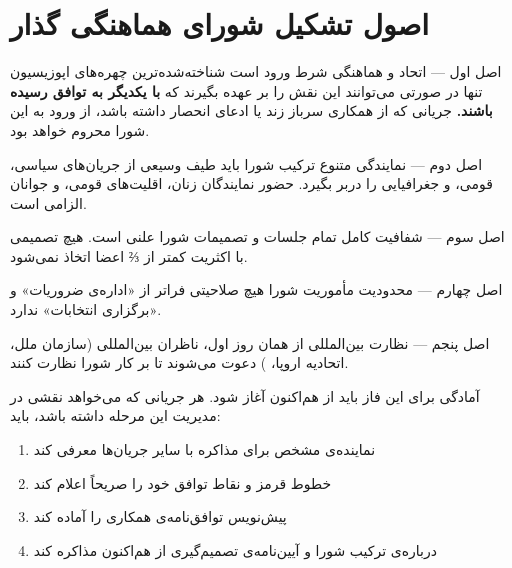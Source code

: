 \documentclass[12pt,a4paper,twoside,openany]{book}
\begin{document}
	\section{اصول تشکیل شورای هماهنگی گذار}
	
	\begin{bandbox}{اصل اول --- اتحاد و هماهنگی شرط ورود است}
		شناخته‌شده‌ترین چهره‌های اپوزیسیون تنها در صورتی می‌توانند این نقش را بر عهده
		بگیرند که \textbf{با یکدیگر به توافق رسیده باشند.} جریانی که از همکاری سرباز زند
		یا ادعای انحصار داشته باشد، از ورود به این شورا محروم خواهد بود.
	\end{bandbox}
	
	\begin{bandbox}{اصل دوم --- نمایندگی متنوع}
		ترکیب شورا باید طیف وسیعی از جریان‌های سیاسی، قومی، و جغرافیایی را دربر بگیرد.
		حضور نمایندگان زنان، اقلیت‌های قومی، و جوانان الزامی است.
	\end{bandbox}
	
	\begin{bandbox}{اصل سوم --- شفافیت کامل}
		تمام جلسات و تصمیمات شورا علنی است. هیچ تصمیمی با اکثریت کمتر از ⅔ اعضا اتخاذ نمی‌شود.
	\end{bandbox}
	
	\begin{bandbox}{اصل چهارم --- محدودیت مأموریت}
		شورا هیچ صلاحیتی فراتر از «اداره‌ی ضروریات» و «برگزاری انتخابات» ندارد.
	\end{bandbox}
	
	\begin{bandbox}{اصل پنجم --- نظارت بین‌المللی}
		از همان روز اول، ناظران بین‌المللی (سازمان ملل، اتحادیه اروپا، ) دعوت
		می‌شوند تا بر کار شورا نظارت کنند.
	\end{bandbox}
	
	\begin{notebox}[title={\rl{فراخوان به جریان‌های اپوزیسیون}}]
		آمادگی برای این فاز باید از هم‌اکنون آغاز شود. هر جریانی که می‌خواهد نقشی در
		مدیریت این مرحله داشته باشد، باید:
		\begin{enumerate}
			\item نماینده‌ی مشخص برای مذاکره با سایر جریان‌ها معرفی کند
			\item خطوط قرمز و نقاط توافق خود را صریحاً اعلام کند
			\item پیش‌نویس توافق‌نامه‌ی همکاری را آماده کند
			\item درباره‌ی ترکیب شورا و آیین‌نامه‌ی تصمیم‌گیری از هم‌اکنون مذاکره کند
		\end{enumerate}
	\end{notebox}
	
\end{document}

